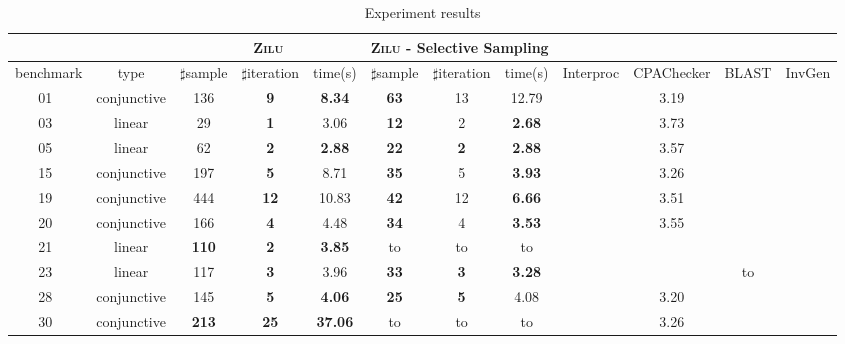 \begin{table}[!h]
\centering
\caption{Experiment results}
{\scriptsize \begin{tabular}{l c | c c c | c c c | c | c | c | c |}
\cline{3-8}
& &\multicolumn{3}{|c|}{\textsc{Zilu}}&\multicolumn{3}{c|}{\textsc{Zilu} - Selective Sampling} \\
\hline
\multicolumn{1}{|c|}{benchmark}&\multicolumn{1}{|c|}{type}& $\sharp$sample & $\sharp$iteration & time(s) & $\sharp$sample & $\sharp$iteration &time(s) & Interproc & CPAChecker & BLAST & InvGen \\
\hline
\multicolumn{1}{|c|}{01~\cite{isil2013inductive}}				&conjunctive	&136  	&\textbf{9}			&\textbf{8.34}		&\textbf{63}	&13			&12.79 & \cmark  	&3.19	  		& \cmark		& \cmark \\
\multicolumn{1}{|c|}{03~\cite{isil2013inductive}}				&linear			&29 	&\textbf{1} 		&3.06       		&\textbf{12} 	&2  		&\textbf{2.68} & \cmark 	&3.73	  		& \cmark		& \cmark \\
\multicolumn{1}{|c|}{05~\cite{isil2013inductive}}				&linear 		&62 	&\textbf{2} 		&\textbf{2.88} 		&\textbf{22} 	&\textbf{2}	&\textbf{2.88} & \cmark  	&3.57	  		& \cmark 		& \cmark  \\
\multicolumn{1}{|c|}{15~\cite{isil2013inductive}}				&conjunctive	&197	&\textbf{5} 		&8.71     			&\textbf{35}	&5 			&\textbf{3.93}  & \cmark	&3.26	  		& \cmark 		& \cmark \\
\multicolumn{1}{|c|}{19~\cite{isil2013inductive}}				&conjunctive	&444	&\textbf{12}		&10.83    			&\textbf{42}	&12			&\textbf{6.66}  & \xmark  	&3.51	  		& \cmark 		& \cmark \\
\multicolumn{1}{|c|}{20~\cite{isil2013inductive}}				&conjunctive	&166	&\textbf{4} 		&4.48     			&\textbf{34}	&4 			&\textbf{3.53}  & \cmark 	&3.55	  		& \cmark 		& \cmark \\
\multicolumn{1}{|c|}{21~\cite{isil2013inductive}}				&linear			&\textbf{110}	&\textbf{2} &\textbf{3.85}     	&to				&to			&to  & \xmark  	&\xmark	  		& \xmark 	& \xmark \\
\multicolumn{1}{|c|}{23~\cite{isil2013inductive}}				&linear			&117	&\textbf{3} 		&3.96     			&\textbf{33}	&\textbf{3}	&\textbf{3.28} & \xmark  	&\xmark	  		& to 		& \cmark  \\
\multicolumn{1}{|c|}{28~\cite{isil2013inductive}}				&conjunctive	&145	&\textbf{5} 		&\textbf{4.06}     	&\textbf{25}	&\textbf{5}	&4.08 & \cmark 	&3.20	  		& \cmark		& \cmark \\
\multicolumn{1}{|c|}{30~\cite{isil2013inductive}}				&conjunctive	&\textbf{213}	&\textbf{25}&\textbf{37.06}		&to				&to 		&to & \xmark  	&3.26	  		& \cmark 	& \cmark \\

\end{tabular}}
\end{table}
